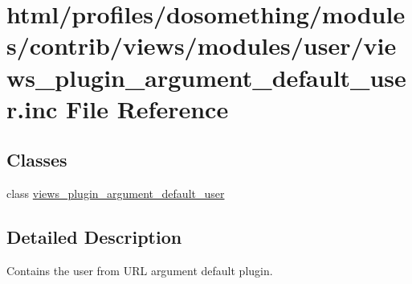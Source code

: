 \hypertarget{views__plugin__argument__default__user_8inc}{
\section{html/profiles/dosomething/modules/contrib/views/modules/user/views\_\-plugin\_\-argument\_\-default\_\-user.inc File Reference}
\label{views__plugin__argument__default__user_8inc}
}
\subsection*{Classes}
\begin{DoxyCompactItemize}
\item 
class \hyperlink{classviews__plugin__argument__default__user}{views\_\-plugin\_\-argument\_\-default\_\-user}
\end{DoxyCompactItemize}


\subsection{Detailed Description}
Contains the user from URL argument default plugin. 